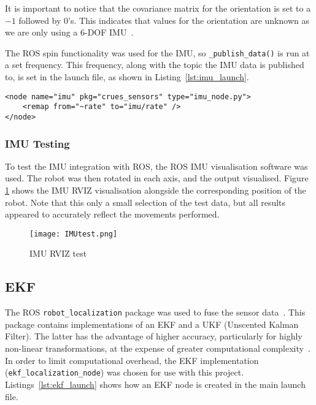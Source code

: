 It is important to notice that the
covariance matrix for the orientation is set to a $-1$ followed by 0's.
This indicates that values for the orientation are unknown as we are only
using a 6-DOF IMU~\cite[sensor\_msgs/Imu.msg]{ROSDocs}. 

The ROS spin functionality was used for the IMU, so
\verb|_publish_data()| is run at a set
frequency. This frequency, along with the topic the
IMU data is published to, is set in the launch file, as
shown in Listing~\ref{lst:imu_launch}.

\begin{lstlisting}[caption={IMU node in ROS launch file}, label={lst:imu_launch}, style=xml]
<node name="imu" pkg="crues_sensors" type="imu_node.py">
    <remap from="~rate" to="imu/rate" />
</node>
\end{lstlisting}

\subsubsection{IMU Testing}\label{soft/odometry/imu/test}

To test the IMU integration with ROS, the ROS IMU visualisation software was used.
The robot was then rotated in each axis, and the output visualised.
Figure \ref{fig:imu_test} shows the IMU RVIZ visualisation alongside the
corresponding position of the robot. Note that this only a small selection
of the test data, but all results appeared to accurately reflect the
movements performed.

\begin{figure}[!ht]
	\centering
	\texttt{[image: IMUtest.png]}
	\caption{IMU RVIZ test}\label{fig:imu_test}
\end{figure}

\subsection{EKF}\label{soft/odometry/ekf}

The ROS \verb|robot_localization| package was used to fuse the sensor
data~\cite{RosRobotLocalization}. This package contains implementations of
an EKF and a UKF (Unscented Kalman Filter). The latter has the advantage of higher
accuracy, particularly for highly non-linear transformations, at the expense of
greater computational complexity~\cite{wan_unscented_2000}. In order to limit
computational overhead, the EKF implementation (\verb|ekf_localization_node|) was
chosen for use with this project. Listings~\ref{lst:ekf_launch} shows how an EKF
node is created in the main launch file.

